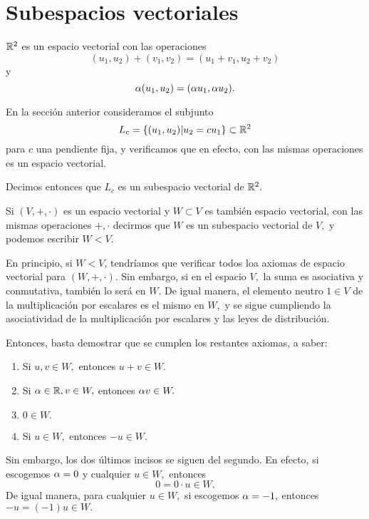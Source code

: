 \section{Subespacios vectoriales}



\begin{resuelto}
 $\mathbb{R}^{2}$ es un espacio vectorial con las operaciones $$(u_{1},u_{2})+(v_{1},v_{2})=(u_{1}+v_{1},u_{2}+v_{2})$$ y
$$\alpha(u_{1}, u_{2})=(\alpha u_{1}, \alpha u_{2}).$$

En la secci\'on anterior consideramos el subjunto $$L_{c}=\left\{ (u_{1},u_{2})|u_{2}=c u_{1} \right\}\subset \mathbb{R}^{2}$$ para  $c$
una pendiente fija, y verificamos que en efecto, con las mismas operaciones es un espacio vectorial.

Decimos entonces que $L_{c}$ es un subespacio vectorial de $\mathbb{R}^{2}.$
\end{resuelto}

\begin{definicion}
 Si $(V, +, \cdot )$ es un espacio vectorial  y
$W\subset V$ es tambi\'en espacio vectorial, con las mismas operaciones $+,\cdot$ decirmos que $W$ es un subespacio
vectorial de $V,$ y podemos escribir $W < V.$
\end{definicion}

En principio, si $W < V$, tendr\'iamos que verificar todos loa axiomas de espacio vectorial para $(W, +, \cdot).$ Sin
embargo, si en el espacio $V,$ la suma es asociativa y conmutativa, tambi\'en lo será en $W.$ De igual manera, el
elemento neutro $1\in V$ de la multiplicaci\'on por escalares es el mismo en $W,$ y se sigue cumpliendo la
asociatividad de la multiplicaci\'on por escalares y las leyes de distribuci\'on.

Entonces, basta demostrar que se cumplen los restantes axiomas, a saber:
\begin{enumerate}
 \item Si $u,v \in W,$ entonces $u+v\in W.$
 \item Si $\alpha \in \mathbb{R}, v \in W,$ entonces $\alpha v\in W.$
 \item $0\in W.$
 \item Si $u\in W,$ entonces $-u\in W.$
\end{enumerate}

Sin embargo, los dos últimos incisos se siguen del segundo. En efecto, si escogemos $\alpha=0$ y cualquier $u\in
W,$ entonces
$$
0=0\cdot u \in W.
$$
De igual manera, para cualquier $u\in W,$ si escogemos $\alpha=-1,$ entonces $-u=(-1)u\in W.$

